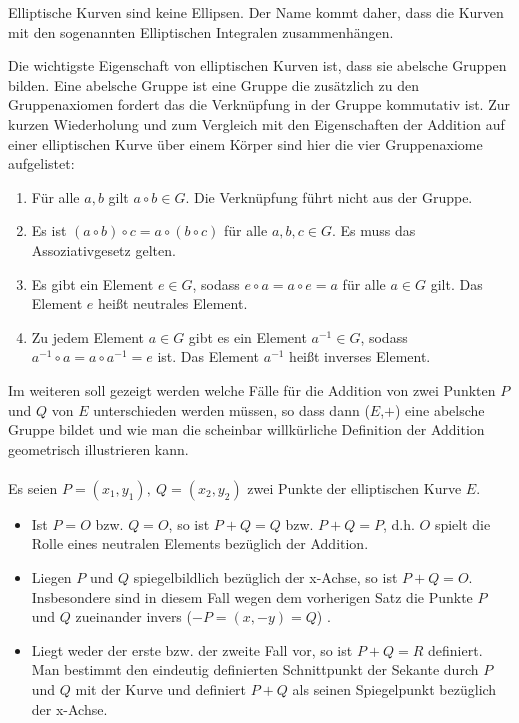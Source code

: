 \documentclass[10pt, bigheadings]{scrartcl}
\begin{document}
Elliptische Kurven sind keine Ellipsen. Der Name kommt daher, dass die Kurven
mit den sogenannten Elliptischen Integralen zusammenhängen. 

Die wichtigste Eigenschaft von elliptischen Kurven ist, dass sie abelsche 
Gruppen bilden. Eine abelsche Gruppe ist eine Gruppe die zusätzlich zu den 
Gruppenaxiomen fordert das die Verknüpfung in der Gruppe kommutativ ist. Zur 
kurzen Wiederholung und zum Vergleich mit den Eigenschaften der Addition auf 
einer elliptischen Kurve über einem Körper sind hier die vier Gruppenaxiome
aufgelistet:
\begin{enumerate}
\item Für alle $a, b$ gilt $a\circ b\in G$. Die Verknüpfung führt nicht aus
        der Gruppe.
\item Es ist $(a\circ b)\circ c = a\circ (b\circ c)$ für alle $a,b,c\in G$. 
        Es muss das Assoziativgesetz gelten.
\item Es gibt ein Element $e\in G$, sodass $e\circ a = a\circ e = a$ für alle
        $a\in G$ gilt. Das Element $e$ heißt neutrales Element.
\item Zu jedem Element $a\in G$ gibt es ein Element $a^{-1}\in G$, sodass
        $a^{-1}\circ a= a\circ a^{-1} = e$ ist. Das Element $a^{-1}$ heißt 
        inverses Element.
\end{enumerate}

Im weiteren soll gezeigt werden welche Fälle für die Addition 
von zwei Punkten $P$ und $Q$ von $E$ unterschieden werden müssen, so dass dann
($E$,$+$) eine abelsche Gruppe bildet und wie man die scheinbar willkürliche
Definition der Addition geometrisch illustrieren kann. \\\\
Es seien $P=(x_1, y_1),\ Q=(x_2, y_2)$ zwei Punkte der elliptischen Kurve $E$.
\begin{itemize}
\item Ist $P=O$ bzw. $Q=O$, so ist $P+Q = Q$ bzw. $P+Q=P$, d.h. $O$ spielt die
        Rolle eines neutralen Elements bezüglich der Addition.

\item Liegen $P$ und $Q$ spiegelbildlich bezüglich der x-Achse, so ist $P+Q=O$.
        Insbesondere sind in diesem Fall wegen dem vorherigen Satz die Punkte 
        $P$ und $Q$ zueinander invers ($ -P=(x,-y) = Q $) .
\item Liegt weder der erste bzw. der zweite Fall vor, so ist $P+Q = R$ definiert.
        Man bestimmt den eindeutig definierten Schnittpunkt der Sekante durch 
        $P$ und $Q$ mit der Kurve und definiert $P+Q$ als seinen Spiegelpunkt
        bezüglich der x-Achse.

\end{itemize}
\end{document}
